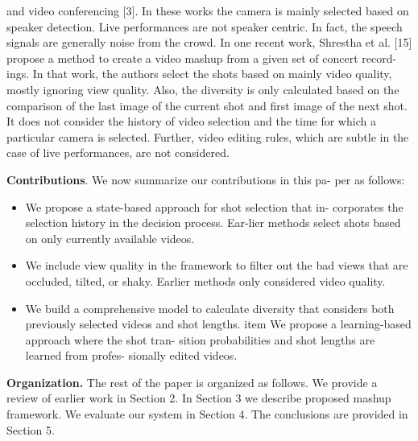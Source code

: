\documentclass{sig-alternate}
\begin{document}
and video conferencing [3]. In these works the camera is mainly
selected based on speaker detection. Live performances are not
speaker centric. In fact, the speech signals are generally noise from
the crowd. In one recent work, Shrestha et al. [15] propose a
method to create a video mashup from a given set of concert record-
ings. In that work, the authors select the shots based on mainly
video quality, mostly ignoring view quality. Also, the diversity is
only calculated based on the comparison of the last image of the
current shot and first image of the next shot. It does not consider
the history of video selection and the time for which a particular
camera is selected. Further, video editing rules, which are subtle in
the case of live performances, are not considered.



\textbf{Contributions}. We now summarize our contributions in this pa-
per as follows:
\begin{itemize}
    \item We propose a state-based approach for shot selection that in-
corporates the selection history in the decision process. Ear-lier methods select shots based on only currently available
videos.
    \item We include view quality in the framework to filter out the
bad views that are occluded, tilted, or shaky. Earlier methods
only considered video quality.
    \item We build a comprehensive model to calculate diversity that
considers both previously selected videos and shot lengths.
    item We propose a learning-based approach where the shot tran-
sition probabilities and shot lengths are learned from profes-
sionally edited videos.
\end{itemize}
    \textbf{Organization.}  The rest of the paper is organized as follows.
We provide a review of earlier work in Section 2. In Section 3 we
describe proposed mashup framework. We evaluate our system in
Section 4. The conclusions are provided in Section 5.
\end{document}
